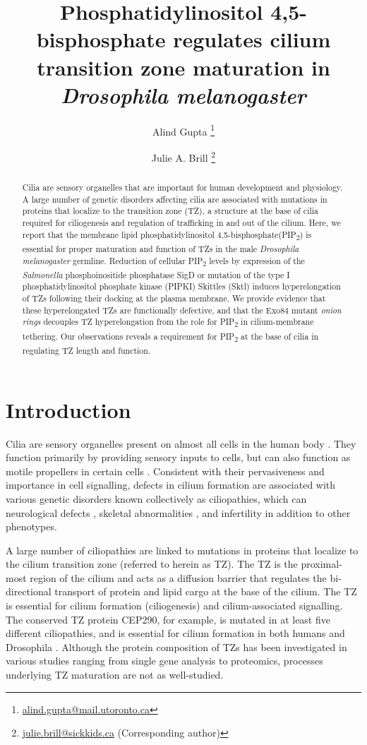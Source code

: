 \documentclass[12pt, twoside, letterpaper]{article}
\title{\bfseries\large Phosphatidylinositol 4,5-bisphosphate regulates cilium transition zone maturation in \textit{Drosophila melanogaster}}
\author[1,2]{Alind Gupta \thanks{\url{alind.gupta@mail.utoronto.ca}}}
\author[1,2]{Julie A. Brill \thanks{\url{julie.brill@sickkids.ca} (Corresponding author)}}
\affil[1]{\small Department of Molecular Genetics, University of Toronto, Toronto, ON M5S 1A8, Canada}
\affil[2]{\small Program in Cell Biology, Hospital for Sick Children, Toronto, ON M5G 1X8, Canada}
\date{}
\newcommand{\PIP}{PIP\textsubscript{2}}
\begin{document}
\maketitle
\raggedright

\begin{abstract}
  \vspace*{-0.7em}
  Cilia are sensory organelles that are important for human development
  and physiology.
  A large number of genetic disorders affecting cilia are associated with
  mutations in proteins that localize to the transition zone (TZ),
  a structure at the base of cilia required for ciliogenesis and
  regulation of trafficking in and out of the cilium.
  Here, we report that the membrane lipid phosphatidylinositol
  4,5-bisphosphate(\PIP{}) is essential for proper maturation and function
  of TZs in the male \textit{Drosophila melanogaster} germline.
  Reduction of cellular \PIP{} levels by expression of the
  \textit{Salmonella} phosphoinositide phosphatase SigD or mutation of
  the type I phosphatidylinositol phosphate kinase (PIPKI) Skittles (Sktl)
  induces hyperelongation of TZs following their docking at the plasma
  membrane.
  We provide evidence that these hyperelongated TZs are functionally
  defective, and that the Exo84 mutant \textit{onion rings} decouples
  TZ hyperelongation from the role for \PIP{} in cilium-membrane
  tethering.
  Our observations reveals a requirement for \PIP{} at the base of cilia
  in regulating TZ length and function.
\end{abstract}


\section{Introduction}
Cilia are sensory organelles present on almost all cells in the human body
\citep{satir2010primary}.
They function primarily by providing sensory inputs to cells, but can
also function as motile propellers in certain cells
\citep{bloodgood2010sensory}.
Consistent with their pervasiveness and importance in cell signalling,
defects in cilium formation are associated with various genetic disorders
known collectively as ciliopathies, which can 
neurological defects \citep{valente2014primary},
skeletal abnormalities \citep{hammarsjo2017novel, waters2011ciliopathies},
and infertility \citep{inaba2016sperm} in addition to other phenotypes.

A large number of ciliopathies are linked to mutations in proteins that
localize to the cilium transition zone (referred to herein as TZ).
The TZ is the proximal-most region of the cilium and
acts as a diffusion barrier that regulates the
bi-directional transport of protein and lipid cargo at the base of the cilium.
The TZ is essential for cilium formation (ciliogenesis) and cilium-associated
signalling.
The conserved TZ protein CEP290, for example, is mutated in at least
five different ciliopathies, and is essential for cilium formation in both humans
and Drosophila \citep{basiri2014migrating}.
Although the protein composition of TZs has been investigated in various
studies ranging from single gene analysis to proteomics,
processes underlying TZ maturation are not as well-studied.
\end{document}
